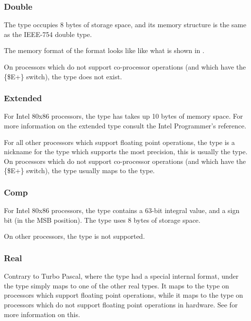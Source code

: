 \subsubsection{Double}

The  type occupies 8 bytes of storage space,
and its memory structure is the same as the IEEE-754 double
type.

The memory format of the  format looks like
like what is shown in .



On processors which do not support co-processor operations (and which have
the \{\$E+\} switch), the  type does not exist.



\subsubsection{Extended}

For Intel 80x86 processors, the  type has
takes up 10 bytes of memory space. For more information
on the extended type consult the Intel Programmer's reference.

For all other processors which support floating point operations,
the  type is a nickname for the type which supports
the most precision, this is usually the  type. 
On processors which do not support co-processor operations (and which have
the \{\$E+\} switch), the  type usually maps to the
 type.

\subsubsection{Comp}

For Intel 80x86 processors, the  type contains
a 63-bit integral value, and a sign bit (in the MSB position).
The  type uses 8 bytes of storage space.

On other processors, the  type is not supported.

\subsubsection{Real}

Contrary to Turbo Pascal, where the  type had
a special internal format, under \fpc the  type
simply maps to one of the other real types. It maps to the
 type on processors which support floating
point operations, while it maps to the  type
on processors which do not support floating point operations
in hardware. See  for more information
on this.

